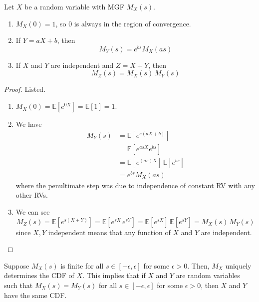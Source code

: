 \documentclass{article}
\begin{document}
      \begin{lemma}
        Let $X$ be a random variable with MGF $M_X (s)$. 
        \begin{enumerate}
          \item $M_X (0) = 1$, so $0$ is always in the region of convergence. 
          \item If $Y = a X + b$, then 
          \begin{equation}
            M_Y (s) = e^{b s} M_X (a s)
          \end{equation}
          \item If $X$ and $Y$ are independent and $Z = X + Y$, then 
          \begin{equation}
            M_Z (s) = M_X (s) \, M_Y (s)
          \end{equation}
        \end{enumerate}
      \end{lemma}
      \begin{proof}
        Listed. 
        \begin{enumerate}
          \item $M_X (0) = \mathbb{E}[e^{0 X}] = \mathbb{E}[1] = 1$. 
          \item We have 
          \begin{align*}
            M_Y (s) & = \mathbb{E} [e^{s(a X + b)}] \\
            & = \mathbb{E}[ e^{a s X } e^{b s}] \\
            & = \mathbb{E}[e^{(as) X}] \, \mathbb{E}[e^{b s}] \\
            & = e^{b s} M_X (a s)
          \end{align*}
          where the penultimate step was due to independence of constant RV with any other RVs. 
          \item We can see 
          \begin{equation}
            M_Z (s) = \mathbb{E}[ e^{s (X + Y)}] = \mathbb{E}[e^{s X} \, e^{s Y}] = \mathbb{E}[e^{s X}] \, \mathbb{E}[e^{s Y}] = M_X (s) \, M_Y (s)
          \end{equation}
          since $X, Y$ independent means that any function of $X$ and $Y$ are independent. 
        \end{enumerate}
      \end{proof}

      \begin{theorem}
        Suppose $M_X (s)$ is finite for all $s \in [-\epsilon, \epsilon]$ for some $\epsilon > 0$. Then, $M_X$ uniquely determines the CDF of $X$. This implies that if $X$ and $Y$ are random variables such that $M_X (s) = M_Y (s)$ for all $s \in [-\epsilon, \epsilon]$ for some $\epsilon > 0$, then $X$ and $Y$ have the same CDF. 
      \end{theorem}
\end{document}
